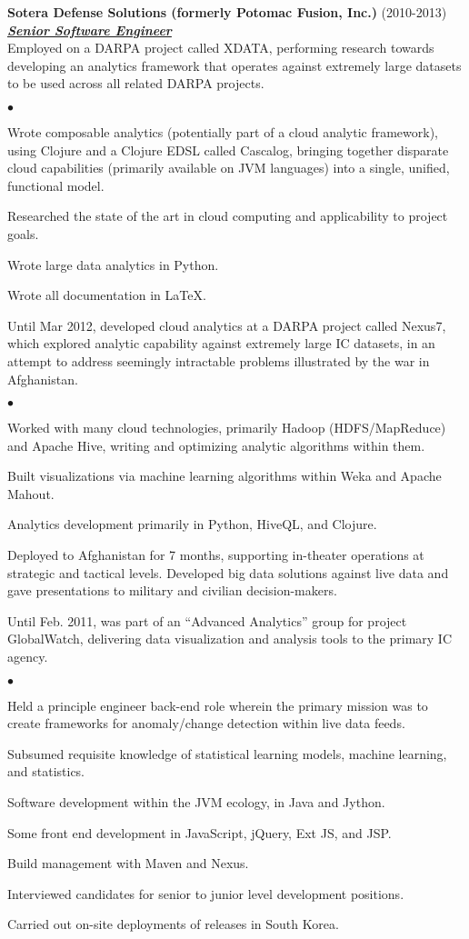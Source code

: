 \documentclass{article}
\newcommand{\employer}[3]{{ \textbf{#1} (#2)\\ \underline{\textbf{\emph{#3}}}\\  }}
\newenvironment{achievements}{\begin{list}{$\bullet$}{\topsep 0pt \itemsep
      -2pt}}{\vspace*{4pt}\end{list}}
\begin{document}
\employer{Sotera Defense Solutions (formerly Potomac Fusion,
  Inc.)}{2010-2013}{Senior Software Engineer} Employed on a DARPA project
called XDATA, performing research towards developing an analytics framework
that operates against extremely large datasets to be used across all related
DARPA projects.
\begin{achievements}
\item Wrote composable analytics (potentially part of a cloud analytic
  framework), using Clojure and a Clojure EDSL called Cascalog, bringing
  together disparate cloud capabilities (primarily available on JVM languages)
  into a single, unified, functional model.
\item Researched the state of the art in cloud computing and applicability to
  project goals.
\item Wrote large data analytics in Python.
\item Wrote all documentation in \LaTeX.
\end{achievements}
Until Mar 2012, developed cloud analytics at a DARPA project called Nexus7,
which explored analytic capability against extremely large IC datasets, in an
attempt to address seemingly intractable problems illustrated by the war in
Afghanistan.
\begin{achievements}
\item Worked with many cloud technologies, primarily Hadoop (HDFS/MapReduce)
  and Apache Hive, writing and optimizing analytic algorithms within them.
\item Built visualizations via machine learning algorithms within Weka and
  Apache Mahout.
\item Analytics development primarily in Python, HiveQL, and Clojure.
\item Deployed to Afghanistan for 7 months, supporting in-theater operations at
  strategic and tactical levels.  Developed big data solutions against live
  data and gave presentations to military and civilian decision-makers.
\end{achievements}
Until Feb. 2011, was part of an ``Advanced Analytics'' group for project
GlobalWatch, delivering data visualization and analysis tools to the primary IC
agency.
\begin{achievements}
\item Held a principle engineer back-end role wherein the primary mission was
  to create frameworks for anomaly/change detection within live data feeds.
\item Subsumed requisite knowledge of statistical learning models, machine
  learning, and statistics.
\item Software development within the JVM ecology, in Java and Jython.
\item Some front end development in JavaScript, jQuery, Ext JS, and JSP.
\item Build management with Maven and Nexus.
\item Interviewed candidates for senior to junior level development positions.
\item Carried out on-site deployments of releases in South Korea.
\end{achievements}
\end{document}
